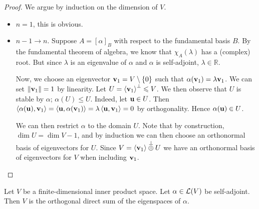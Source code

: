 \documentclass[a4paper]{article}
\begin{document}
\begin{proof}
	We argue by induction on the dimension of $V$. 
	\begin{itemize}
		\item $n=1$, this is obvious. 
		\item $ n-1\to n $. Suppose \( A = [\alpha]_B \) with respect to the fundamental basis \( B \). By the fundamental theorem of algebra, we know that \( \chi_A(\lambda) \) has a (complex) root.
		But since \( \lambda \) is an eigenvalue of \( \alpha \) and \( \alpha \) is self-adjoint, \( \lambda \in \mathbb R \).

		Now, we choose an eigenvector \( {\bf v}_1 = V \setminus \qty{0} \) such that \( \alpha({\bf v}_1) = \lambda {\bf v}_1 \).
		We can set \( \norm{{\bf v}_1} = 1 \) by linearity.
		Let \( U = \left\langle{} {\bf v}_1 \right\rangle^\perp \leqslant V \).
		We then observe that \( U \) is stable by \( \alpha \); \( \alpha(U) \leq U \).
		Indeed, let \( {\bf u} \in U \).
		Then \( \left\langle{\alpha({\bf u}), {\bf v}_1}\right\rangle = \left\langle{{\bf u}, \alpha({\bf v}_1)}\right\rangle = \lambda \left\langle{{\bf u}, {\bf v}_1}\right\rangle = 0 \) by orthogonality.
		Hence \( \alpha({\bf u}) \in U \).

		We can then restrict \( \alpha \) to the domain \( U \). Note that by construction, $ \dim U = \dim V - 1 $, and by induction we can then choose an orthonormal basis of eigenvectors for \( U \).
		Since \( V = \left\langle{} {\bf v}_1 \right\rangle \overset{\perp}{\oplus} U \) we have an orthonormal basis of eigenvectors for \( V \) when including \( {\bf v}_1 \).\qedhere
	\end{itemize}
\end{proof}
\begin{corollary}
	Let \( V \) be a finite-dimensional inner product space.
	Let \( \alpha \in {\mathcal{L}}(V) \) be self-adjoint.
	Then \( V \) is the orthogonal direct sum of the eigenspaces of \( \alpha \).
\end{corollary}
\end{document}
